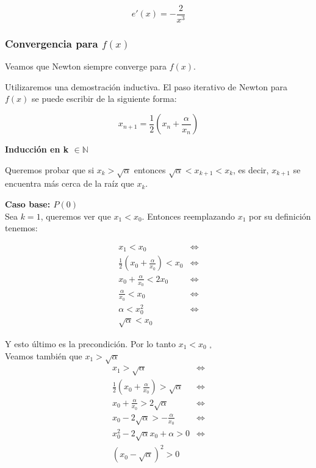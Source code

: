 \begin{equation}\label{e_x}
    e'(x) = -\frac{2}{x^3}
\end{equation}


\subsubsection{Convergencia para $f(x)$}\label{sec:convergencia}

Veamos que Newton siempre converge para $f(x)$.

Utilizaremos una demostración inductiva. El paso iterativo de Newton para
$f(x)$ se puede escribir de la siguiente forma:

\[
    x_{n + 1} = \frac{ 1 }{ 2 } ( x_n + \frac{ \alpha }{ x_n })
\]

{\bf Inducción en k $\in \mathbb{N}$}

Queremos probar que si $x_k > \sqrt{\alpha}$ entonces $\sqrt{\alpha} < x_{k + 1}
< x_k$, es decir, $x_{k + 1}$ se encuentra más cerca de la raíz que $x_k$.

{\bf Caso base: $P(0)$}\\

Sea $k = 1$, queremos ver que $x_1 < x_0$. Entonces reemplazando $x_1$ por su definición tenemos:

\begin{align*}
    x_1 < x_0 &\iff \\
    \frac{1}{2}(x_0 + \frac{\alpha}{x_0}) < x_0 &\iff \\
    x_0 + \frac{\alpha}{x_0} < 2x_0 &\iff \\
    \frac{\alpha}{x_0} < x_0 &\iff \\
    \alpha < x_0^2 &\iff \\
    \sqrt{\alpha} < x_0&
\end{align*}

Y esto último es la precondición. Por lo tanto $x_1 < x_0$ $_\square$\\

Veamos también que $x_1 > \sqrt{\alpha}$\\

\begin{align*}
    x_1 > \sqrt{\alpha} &\iff \\
    \frac{1}{2}(x_0 + \frac{\alpha}{x_0}) > \sqrt{\alpha} &\iff \\
    x_0 + \frac{\alpha}{x_0} > 2\sqrt{\alpha} &\iff \\
    x_0 - 2\sqrt{\alpha} > -\frac{\alpha}{x_0} &\iff \\
    x_0^2 - 2\sqrt{\alpha}x_0 + \alpha > 0 &\iff \\
    {(x_0 - \sqrt{\alpha})}^2 > 0
\end{align*}

